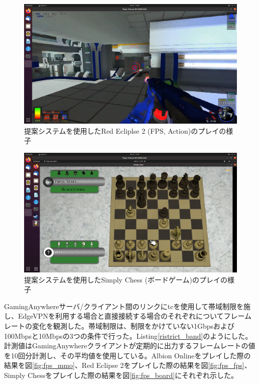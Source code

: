 \begin{figure}[h!]
    \centering
    \includegraphics[width=\textwidth,keepaspectratio,clip]{img/screen_fps.pdf}
    \caption{提案システムを使用したRed Ecliplse 2 (FPS, Action)のプレイの様子}
    \label{fig:screen_fps}
\end{figure}

\begin{figure}[h!]
    \centering
    \includegraphics[width=\textwidth,keepaspectratio,clip]{img/screen_board.pdf}
    \caption{提案システムを使用したSimply Chess (ボードゲーム)のプレイの様子}
    \label{fig:screen_board}
\end{figure}

GamingAnywhereサーバ/クライアント間のリンクにtcを使用して帯域制限を施し、EdgeVPNを利用する場合と直接接続する場合のそれぞれについてフレームレートの変化を観測した。帯域制限は、制限をかけていない1Gbpsおよび100Mbpsと10Mbpsの3つの条件で行った。Listing\ref{ristrict_band}のようにした。計測値はGamingAnywhereクライアントが定期的に出力するフレームレートの値を10回分計測し、その平均値を使用している。Albion Onlineをプレイした際の結果を図\ref{fig:fps_mmo}、Red Eclipse 2をプレイした際の結果を図\ref{fig:fps_fps}、Simply Chessをプレイした際の結果を図\ref{fig:fps_board}にそれぞれ示した。

